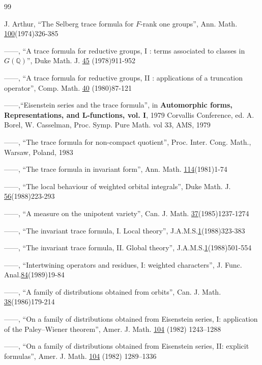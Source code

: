 
\begin{thebibliography}{99}

 J. Arthur,
``The Selberg trace formula for $F$-rank one groups'', Ann.
Math. \underline{100}(1974)326-385

 ------,
``A trace formula for reductive groups, I : terms associated to
classes in $G(\mathbb{Q})$'', Duke Math. J. \underline{45} (1978)911-952

  ------,
``A trace formula for reductive groups, II : applications of a
truncation operator'', Comp. Math. \underline{40} (1980)87-121

 ------,``Eisenstein series and the trace formula'', in
{\bf Automorphic forms, Representations, and
L-functions, vol. I}, 1979 Corvallis Conference, ed. A. Borel, W. Casselman,
Proc. Symp. Pure Math. vol 33, AMS, 1979 

 ------,
``The trace formula for non-compact quotient'', Proc. Inter.
Cong. Math., Warsaw, Poland, 1983

 ------, ``The trace formula in invariant form'', Ann. Math.
\underline{114}(1981)1-74

 ------, ``The local behaviour of weighted orbital integrals'',
Duke Math. J. \underline{56}(1988)223-293

 ------, ``A measure on the unipotent variety'', Can. J. Math.
\underline{37}(1985)1237-1274

 ------, ``The invariant trace formula, I. Local theory'',
J.A.M.S.\underline{1}(1988)323-383

 ------, ``The invariant trace formula, II. Global theory'',
J.A.M.S.\underline{1}(1988)501-554

 ------, ``Intertwining operators and residues, I: weighted
characters'', J. Func. Anal.\underline{84}(1989)19-84

 ------, ``A family of distributions obtained from
orbits'', Can. J.
Math. \underline{38}(1986)179-214

 ------, ``On a family of distributions obtained from
Eisenstein series, I: application of the Paley--Wiener theorem'', Amer. J.
Math. \underline{104} (1982) 1243--1288

 ------, ``On a family of distributions obtained from
Eisenstein series, II: explicit formulas'', Amer. J. Math.
\underline{104} (1982) 1289--1336


\end{thebibliography}
